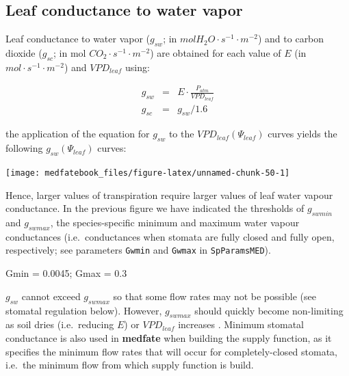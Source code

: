 \documentclass[]{book}
\newenvironment{Shaded}{\begin{snugshade}}{\end{snugshade}}
\newcommand{\FloatTok}[1]{\textcolor[rgb]{0.00,0.00,0.81}{#1}}
\newcommand{\StringTok}[1]{\textcolor[rgb]{0.31,0.60,0.02}{#1}}
\newcommand{\NormalTok}[1]{#1}
\begin{document}
\subsection{Leaf conductance to water
vapor}\label{leaf-conductance-to-water-vapor}

Leaf conductance to water vapor (\(g_{sw}\); in
\(mol H_2O \cdot s^{-1} \cdot m^{-2}\)) and to carbon dioxide
(\(g_{sc}\); in mol \(CO_{2} \cdot s^{-1} \cdot m^{-2}\)) are obtained
for each value of \(E\) (in \(mol \cdot s^{-1} \cdot m^{-2}\)) and
\(VPD_{leaf}\) using:

\begin{eqnarray}
g_{sw} &=& E \cdot \frac{P_{atm}}{VPD_{leaf}}\\
g_{sc} &=& g_{sw}/1.6
\end{eqnarray}

the application of the equation for \(g_{sw}\) to the
\(VPD_{leaf}(\Psi_{leaf})\) curves yields the following
\(g_{sw}(\Psi_{leaf})\) curves:

\begin{center}\texttt{[image: medfatebook\_files/figure-latex/unnamed-chunk-50-1]} \end{center}

Hence, larger values of transpiration require larger values of leaf
water vapour conductance. In the previous figure we have indicated the
thresholds of \(g_{swmin}\) and \(g_{swmax}\), the species-specific
minimum and maximum water vapour conductances (i.e.~conductances when
stomata are fully closed and fully open, respectively; see parameters
\texttt{Gwmin} and \texttt{Gwmax} in \texttt{SpParamsMED}).

\begin{Shaded}
\begin{Highlighting}[]
\NormalTok{Gmin =}\StringTok{ }\FloatTok{0.0045}\NormalTok{;}
\NormalTok{Gmax =}\StringTok{ }\FloatTok{0.3}
\end{Highlighting}
\end{Shaded}

\(g_{sw}\) cannot exceed \(g_{swmax}\) so that some flow rates may not
be possible (see stomatal regulation below). However, \(g_{swmax}\)
should quickly become non-limiting as soil dries (i.e.~reducing \(E\))
or \(VPD_{leaf}\) increases \citep{Sperry2016}. Minimum stomatal
conductance is also used in \textbf{medfate} when building the supply
function, as it specifies the minimum flow rates that will occur for
completely-closed stomata, i.e.~the minimum flow from which supply
function is build.
\end{document}
